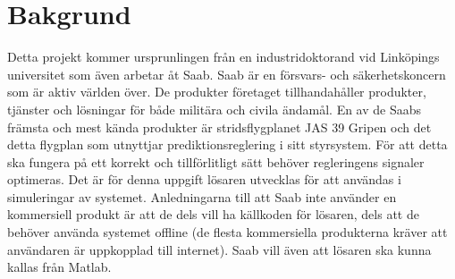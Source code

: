 \section{Bakgrund}    
Detta projekt kommer ursprunlingen från en industridoktorand vid Linköpings universitet som även arbetar åt Saab. Saab är en försvars- och säkerhetskoncern som är aktiv världen över. De produkter företaget tillhandahåller produkter, tjänster och lösningar för både militära och civila ändamål. \citep{saabbrief}
\newline
\newline
En av de Saabs främsta och mest kända produkter är stridsflygplanet JAS 39 Gripen och det detta flygplan som utnyttjar prediktionsreglering i sitt styrsystem. För att detta ska fungera på ett korrekt och tillförlitligt sätt behöver regleringens signaler optimeras. Det är för denna uppgift lösaren utvecklas för att användas i simuleringar av systemet. 
\newline
\newline
Anledningarna till att Saab inte använder en kommersiell produkt är att de dels vill ha källkoden för lösaren, dels att de behöver använda systemet offline (de flesta kommersiella produkterna kräver att användaren är uppkopplad till internet).  
\newline
\newline
Saab vill även att lösaren ska kunna kallas från Matlab. 